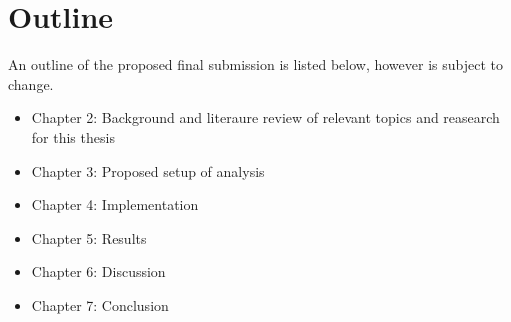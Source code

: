 \section{Outline}
\label{sec:Outline}
An outline of the proposed final submission is listed below, however is subject to change.

\begin{itemize}
  \item Chapter 2: Background and literaure review of relevant topics and reasearch for this thesis
  \item Chapter 3: Proposed setup of analysis
  \item Chapter 4: Implementation
  \item Chapter 5: Results
  \item Chapter 6: Discussion
  \item Chapter 7: Conclusion
\end{itemize}






